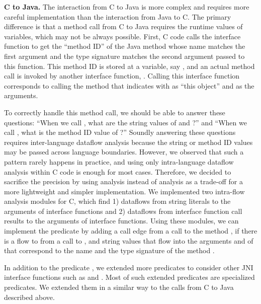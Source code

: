 \textbf{C to Java.} The interaction from C to Java is more complex and
requires more careful implementation than the interaction from Java to C.
The primary difference is that a method call from C to Java requires
the runtime values of variables, which may not be always possible.
First, C code calls the interface function 
to get the ``method ID'' of the Java method whose name matches the first argument
and the type signature matches the second argument passed to this function.
This method ID is stored at a variable, say , and
an actual method call is invoked by another
interface function, . Calling this interface 
function corresponds to calling the method that  indicates
with  as ``this object'' and  as the arguments.

To correctly handle this method call, we should be able to answer these
questions: ``When we call ,
what are the string values of  and ?'' and
``When we call , what is the method ID value of ?''
Soundly answering these questions requires inter-language dataflow analysis
because the string or method ID values may be passed across language boundaries.
However, we observed that such a pattern rarely happens in practice,
and using only intra-language dataflow analysis within C code is enough for most cases.
Therefore, we decided to sacrifice the precision
by using  analysis instead of  analysis
as a trade-off for a more lightweight and simpler implementation.
We implemented two intra-flow analysis modules for C,
which find 1) dataflows from string literals to the arguments of interface functions
and 2) dataflows from interface function call results to the arguments of interface functions.
Using these modules, we can implement the
predicate  by adding a call edge from a 
call to the method , if there is a flow to  from a
call to , and string values that flow into the
arguments  and  of  that
correspond to the name and the type signature of the method .

In addition to the predicate ,
we extended more predicates to consider other JNI interface functions such as
 and .
Most of such extended predicates are specialized  predicates.
We extended them in a similar way to the calls from C to Java described above.

